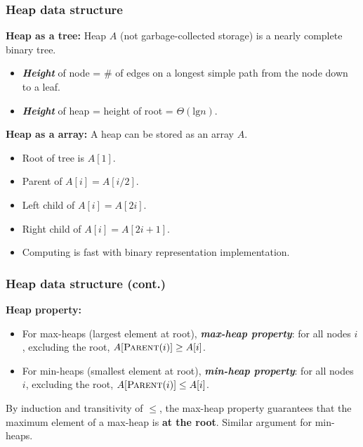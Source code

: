 \documentclass[notes,serif]{beamer}
\begin{document}
\begin{frame}
  \frametitle{Heap data structure}
  \begin{block}{\bf Heap as a tree:}
  Heap $A$ (not garbage-collected storage) is a nearly complete binary tree.
      \begin{itemize}
        \item {\bf \em Height} of node = \# of edges on a longest simple path from the node down to a leaf.
        \item {\bf \em Height} of heap = height of root = $\Theta (\text{lg} n)$. 
      \end{itemize}
  \end{block}
      
  \begin{exampleblock}{{\bf Heap as a array:} A heap can be stored as an array $A$.}
    \begin{itemize}
      \item Root of tree is $A[1]$. 
      \item Parent of $A[i ] = A[	i/2]$. 
      \item Left child of $A[i ] = A[2i ]$.
      \item Right child of $A[i ] = A[2i + 1]$.
      \item Computing is fast with binary representation implementation.
    \end{itemize}
  \end{exampleblock}
\end{frame}

\begin{frame}
  \frametitle{Heap data structure (cont.)}
  \begin{exampleblock}{\bf Heap property:}
      \begin{itemize}
        \item For max-heaps (largest element at root), {\bf \em max-heap property}: for all nodes $i$,
excluding the root, $A[\textsc{Parent}(i)] \ge A[i]$.
        \item For min-heaps (smallest element at root), {\bf \em min-heap property}: for all nodes $i$,
excluding the root, $A[\textsc{Parent}(i )] \le A[i]$.
      \end{itemize}
  \end{exampleblock}

    By induction and transitivity of $\le$, the max-heap property guarantees that the maximum element of a max-heap is {\bf at the root}.  Similar argument for min-heaps.
\end{frame}
\end{document}
